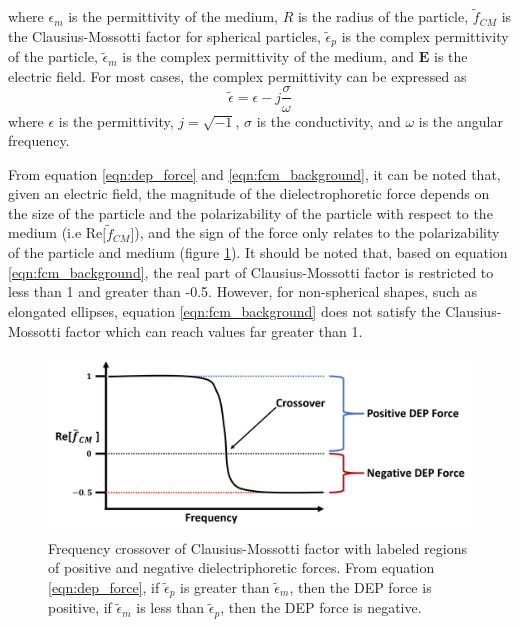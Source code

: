  \noindent where $\epsilon_m$ is the permittivity of the medium, $R$ is the radius of the particle, $\tilde{f}_{CM}$ is the Clausius-Mossotti factor for spherical particles,  $\tilde{\epsilon}_p$ is the complex permittivity of the particle, $\tilde{\epsilon}_m$ is the complex permittivity of the medium, and $\textbf{E}$ is the electric field. For most cases, the complex permittivity can be expressed as 
 \begin{equation}
     \tilde{\epsilon} = \epsilon - j\frac{\sigma}{\omega}
 \end{equation}
\noindent where $\epsilon$ is the permittivity, $j = \sqrt{-1}$, $\sigma$ is the conductivity, and $\omega$ is the angular frequency. 

\par From equation \ref{eqn:dep_force} and \ref{eqn:fcm_background}, it can be noted that, given an electric field, the magnitude of the dielectrophoretic force depends on the size of the particle and the polarizability of the particle with respect to the medium (i.e Re$\big[\tilde{f}_{CM}\big]$), and the sign of the force only relates to the polarizability of the particle and medium (figure \ref{fig:freq_crossover}). It should be noted that, based on equation \ref{eqn:fcm_background}, the real part of Clausius-Mossotti factor is restricted to less than 1 and greater than -0.5. However, for non-spherical shapes, such as elongated ellipses, equation \ref{eqn:fcm_background} does not satisfy the Clausius-Mossotti factor which can reach values far greater than 1.  


\begin{figure}[ht]
 \centering
 \includegraphics[width=\textwidth]{images/DEPCrossover.png}
 \caption[Frequency crossover of Clausius-Mossotti factor] {Frequency crossover of Clausius-Mossotti factor with labeled regions of positive and negative dielectriphoretic forces. From equation \ref{eqn:dep_force}, if $\tilde{\epsilon}_p$ is greater than $\tilde{\epsilon}_m$, then the DEP force is positive, if $\tilde{\epsilon}_m$ is less than $\tilde{\epsilon}_p$, then the DEP force is negative.}
 \label{fig:freq_crossover}
\end{figure}
 
